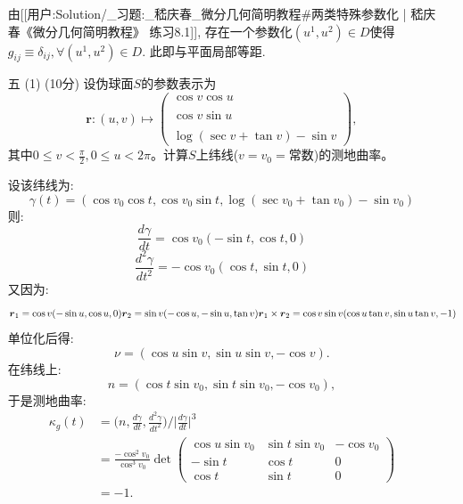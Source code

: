 \begin{itemize}
    \begin{proofc}
        由[[用户:Solution/_习题:_嵇庆春_微分几何简明教程#两类特殊参数化 | 嵇庆春《微分几何简明教程》 练习8.1]], 存在一个参数化$(u^1,u^2)\in D$使得 $g_{ij} \equiv \delta_{ij}, \forall (u^1,u^2)\in D$.
        此即与平面局部等距. 
    \end{proofc}
    \item[五] (1) (10分) 设伪球面$S$的参数表示为
    \[\boldsymbol{r}:(u,v)\mapsto\begin{pmatrix}
    \cos v\cos u\\ \\\cos v\sin u\\ \\\log(\sec v+\tan v)-\sin v\end{pmatrix},\]
    其中$0\le v<\frac{\pi}{2},0\le u<2\pi$。计算$S$上纬线($v=v_0=$常数)的测地曲率。
    \begin{proofc}[解]
        设该纬线为:
        $$
            \gamma(t)=(\cos v_{0}\cos t,\cos v_{0}\sin t,\log(\sec v_{0}+\tan v_{0})-\sin v_{0})
        $$
        则:
        $$
            \frac{d\gamma}{dt}=\cos v_{0}(-\sin t,\cos t,0)
        $$
        $$
            \frac{d^{2}\gamma}{dt^{2}}=-\cos v_{0}(\cos t,\sin t,0)
        $$
        又因为:
        $$
            \boldsymbol{r}_{1}=\cos v(-\sin u,\cos u,0)\\
            \boldsymbol{r}_{2}=\sin v(-\cos u,-\sin u,\tan v)\\
            \boldsymbol{r}_{1}\times\boldsymbol{r}_{2}=\cos v\sin v(\cos u\tan v,\sin u\tan v,-1)
        $$
        单位化后得:
        $$
            \nu =(\cos u\sin v,\sin u\sin v,-\cos v).
        $$
        在纬线上:
        $$
            n=(\cos t\sin v_{0},\sin t\sin v_{0},-\cos v_{0}),
        $$
        于是测地曲率:
        \begin{align*}
            \kappa_{g}(t)&=\Big(n,\frac{d\gamma}{dt},\frac{d^{2}\gamma}{dt^{2}}\Big)\bigg/\Big|\frac{d\gamma}{dt}\Big|^{3}\\
            &=\frac{-\cos^{2}v_{0}}{\cos^{3}v_{0}}\det
            \begin{pmatrix}
                \cos u\sin v_{0}& \sin t\sin v_{0}&-\cos v_{0}\\
                -\sin t& \cos t&0\\
                \cos t&\sin t & 0
            \end{pmatrix}\\
            &=-1.
        \end{align*}
    \end{proofc}

\end{itemize}
